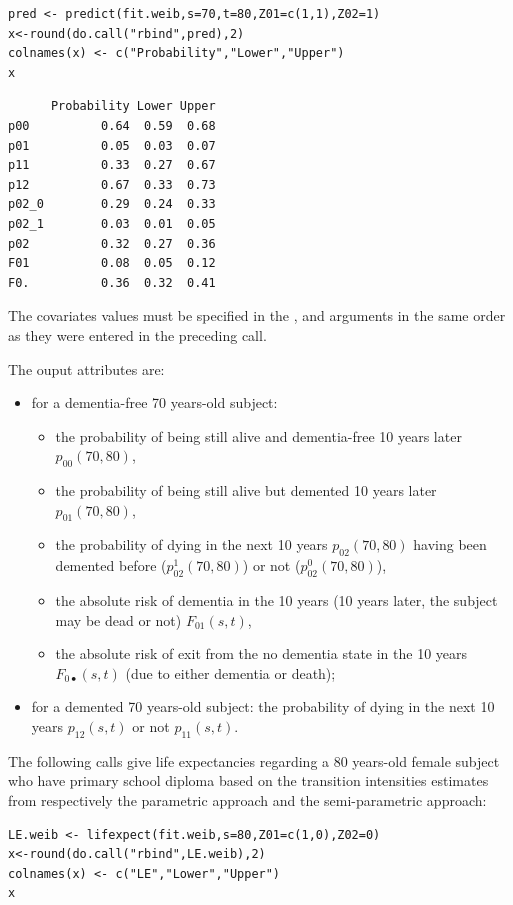 \documentclass[article]{jss}
\begin{document}
\lstset{language=R,label= ,caption= ,numbers=none}
\begin{lstlisting}
pred <- predict(fit.weib,s=70,t=80,Z01=c(1,1),Z02=1)
x<-round(do.call("rbind",pred),2)
colnames(x) <- c("Probability","Lower","Upper")
x
\end{lstlisting}

\begin{verbatim}
      Probability Lower Upper
p00          0.64  0.59  0.68
p01          0.05  0.03  0.07
p11          0.33  0.27  0.67
p12          0.67  0.33  0.73
p02_0        0.29  0.24  0.33
p02_1        0.03  0.01  0.05
p02          0.32  0.27  0.36
F01          0.08  0.05  0.12
F0.          0.36  0.32  0.41
\end{verbatim}

The covariates values must be specified in the ,  and  
arguments in the same order as they were entered in the preceding  call.

The ouput attributes are:
\begin{itemize}
\item for a dementia-free 70 years-old subject: 
\begin{itemize}
\item the probability of being still alive and dementia-free 10 years later \(p_{00}(70,80)\),
\item the probability of being still alive but demented 10 years later \(p_{01}(70,80)\),
\item the probability of dying in the next 10 years \(p_{02}(70,80)\) having been demented before (\(p_{02}^1(70,80)\)) or not (\(p_{02}^0(70,80)\)),
\item the absolute risk of dementia in the 10 years (10 years later, the subject may be dead or not) \(F_{01}(s,t)\),
\item the absolute risk of exit from the no dementia state in the 10 years \(F_{0 \scriptscriptstyle{\bullet}}(s,t)\) (due to either dementia or death);
\end{itemize}
\item for a demented 70 years-old subject: the probability of dying in the next 10 years \(p_{12}(s,t)\) or not \(p_{11}(s,t)\).
\end{itemize}

The following calls give life expectancies regarding 
a 80 years-old female subject who have primary school diploma based on the 
transition intensities estimates from respectively the parametric approach 
and the semi-parametric approach:
\lstset{language=R,label= ,caption= ,numbers=none}
\begin{lstlisting}
LE.weib <- lifexpect(fit.weib,s=80,Z01=c(1,0),Z02=0)
x<-round(do.call("rbind",LE.weib),2)
colnames(x) <- c("LE","Lower","Upper")
x
\end{lstlisting}
\end{document}
